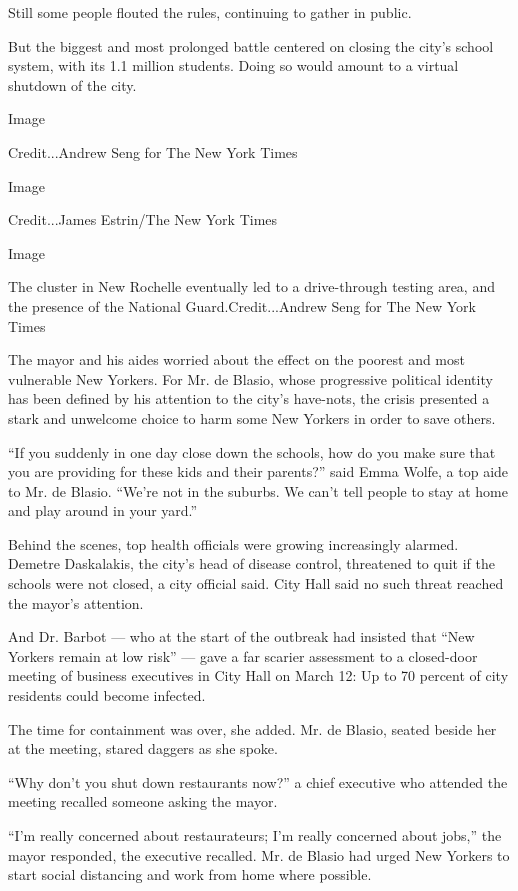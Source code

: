 Still some people flouted the rules, continuing to gather in public.

But the biggest and most prolonged battle centered on closing the city's
school system, with its 1.1 million students. Doing so would amount to a
virtual shutdown of the city.

Image

Credit...Andrew Seng for The New York Times

Image

Credit...James Estrin/The New York Times

Image

The cluster in New Rochelle eventually led to a drive-through testing
area, and the presence of the National Guard.Credit...Andrew Seng for
The New York Times

The mayor and his aides worried about the effect on the poorest and most
vulnerable New Yorkers. For Mr. de Blasio, whose progressive political
identity has been defined by his attention to the city's have-nots, the
crisis presented a stark and unwelcome choice to harm some New Yorkers
in order to save others.

``If you suddenly in one day close down the schools, how do you make
sure that you are providing for these kids and their parents?'' said
Emma Wolfe, a top aide to Mr. de Blasio. ``We're not in the suburbs. We
can't tell people to stay at home and play around in your yard.''

Behind the scenes, top health officials were growing increasingly
alarmed. Demetre Daskalakis, the city's head of disease control,
threatened to quit if the schools were not closed, a city official said.
City Hall said no such threat reached the mayor's attention.

And Dr. Barbot --- who at the start of the outbreak had insisted that
``New Yorkers remain at low risk'' --- gave a far scarier assessment to
a closed-door meeting of business executives in City Hall on March 12:
Up to 70 percent of city residents could become infected.

The time for containment was over, she added. Mr. de Blasio, seated
beside her at the meeting, stared daggers as she spoke.

``Why don't you shut down restaurants now?'' a chief executive who
attended the meeting recalled someone asking the mayor.

``I'm really concerned about restaurateurs; I'm really concerned about
jobs,'' the mayor responded, the executive recalled. Mr. de Blasio had
urged New Yorkers to start social distancing and work from home where
possible.

